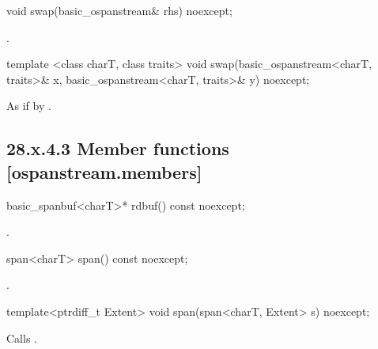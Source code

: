 \documentclass[ebook,11pt,article]{memoir}
\begin{document}
\begin{itemdecl}
void swap(basic_ospanstream& rhs) noexcept;
\end{itemdecl}

\begin{itemdescr}
\pnum
\effects 
{}.
\end{itemdescr}


\begin{itemdecl}
template <class charT, class traits>
  void swap(basic_ospanstream<charT, traits>& x,
            basic_ospanstream<charT, traits>& y) noexcept;
\end{itemdecl}

\begin{itemdescr}
\pnum
\effects As if by .
\end{itemdescr}

\subsection{28.x.4.3 Member functions [ospanstream.members]}
\label{ospanstream.members}

\begin{itemdecl}
basic_spanbuf<charT>* rdbuf() const noexcept;
\end{itemdecl}

\begin{itemdescr}
\pnum
\returns
{}.
\end{itemdescr}

\begin{itemdecl}
span<charT> span() const noexcept;
\end{itemdecl}

\begin{itemdescr}
\pnum
\returns
{}.
\end{itemdescr}

\begin{itemdecl}
template<ptrdiff_t Extent>
void span(span<charT, Extent> s) noexcept;
\end{itemdecl}

\begin{itemdescr}
\pnum
\effects
Calls
.
\end{itemdescr}
\end{document}
